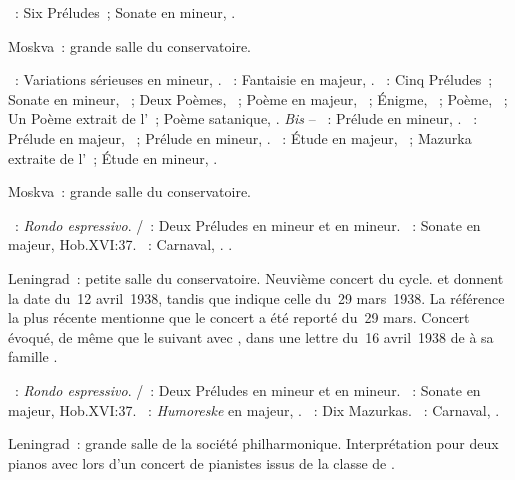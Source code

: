 \begin{description}
 \textsc{\Scriabine{}}~: Six Préludes~; Sonate en \kF \Sharp mineur,
 .
 \item[\DateWithWeekDay{1938-04-01}]
 Moskva~: grande salle du conservatoire.

 \textsc{\Mendelssohn{}}~: Variations sérieuses en \kD mineur, .
 \textsc{\Schumann{}}~: Fantaisie en \kC majeur, .
 \textsc{\Scriabine{}}~: Cinq Préludes~; Sonate en \kF \Sharp mineur,
 ~; Deux Poèmes, ~; Poème en \kC majeur, 
 ~; Énigme,  ~; Poème,  ~;
 Un Poème extrait de l'~; Poème satanique, .
 \emph{Bis} -- \textsc{\Scriabine{}}~: Prélude en \kG mineur, 
 .
 \textsc{\Rachmaninov{}}~: Prélude en \kG majeur,  ~;
 Prélude en \kG \Sharp mineur,  .
 \textsc{\Scriabine{}}~: Étude en \kD \Flat majeur,  ~;
 Mazurka extraite de l'~; Étude en \kD \Sharp mineur, 
 .
 \item[\DateWithWeekDay{1938-04-03}]
 Moskva~: grande salle du conservatoire.

 \textsc{\CBach{}}~: \emph{Rondo espressivo}.
 \textsc{\JBach{}/\Ziloti{}}~: Deux Préludes en \kE mineur et en \kB mineur.
 \textsc{\Haydn{}}~: Sonate en \kD majeur, Hob.XVI:37.
 \textsc{\Schumann{}}~: Carnaval, .
 \textsc{\Scriabine{}}.
 \item[\DateWithWeekDay{1938-04-12}]
 Leningrad~: petite salle du conservatoire.
 Neuvième concert du cycle.
 \citet[p.~158]{Nekrasova08} et \citet[p.~412]{Scriabine} donnent la date
 du~12 avril~1938, tandis que \citet[p.~49]{White} indique celle du~29
 mars~1938.
 La référence la plus récente mentionne que le concert a été reporté du~29
 mars.
 Concert évoqué, de même que le suivant avec \DChostakovitch{}, dans une
 lettre du~16 avril~1938 de \VSofronitsky{} à sa famille
 \citep[p.~23]{Kogan08}.

 \textsc{\CBach{}}~: \emph{Rondo espressivo}.
 \textsc{\JBach{}/\Ziloti{}}~: Deux Préludes en \kE mineur et en \kB mineur.
 \textsc{\Haydn{}}~: Sonate en \kD majeur, Hob.XVI:37.
 \textsc{\Schumann{}}~: \emph{Humoreske} en \kB \Flat majeur, .
 \textsc{\Chopin{}}~: Dix Mazurkas.
 \textsc{\Schumann{}}~: Carnaval, .
 \item[\DateWithWeekDay{1938-04-15}]
 Leningrad~: grande salle de la société philharmonique.
 Interprétation pour deux pianos avec \DChostakovitch{} lors d'un concert de
 pianistes issus de la classe de \LNikolaiev{}.


\end{description}
